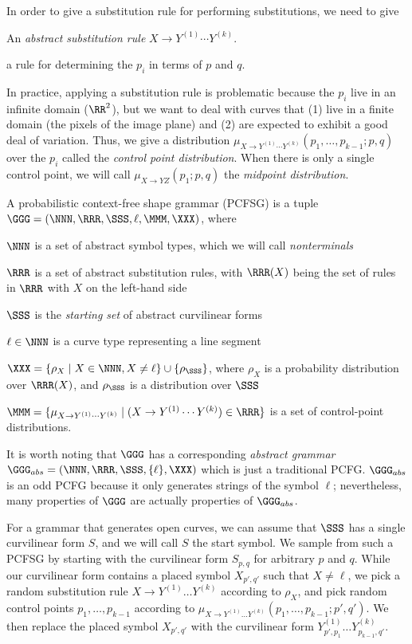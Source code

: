 In order to give a substitution rule for performing substitutions, we
need to give
\bitem
\item An {\em abstract substitution rule} $X\to Y^{(1)}\cdots Y^{(k)}$.
\item a rule for determining the $p_i$ in terms of $p$ and $q$.
\eitem

In practice, applying a substitution rule is problematic because the
$p_i$ live in an infinite domain ($\RR^2$), but we want to deal with
curves that (1) live in a finite domain (the pixels of the image
plane) and (2) are expected to exhibit a good deal of variation. Thus,
we give a distribution $\mu_{X\to Y^{(1)}\cdots Y^{(k)}}(p_1,\dots,
p_{k-1} ; p,q)$ over the $p_i$ called the {\em control point distribution}. 
When there is only a single control point, we will call $\mu_{X\to
YZ}(p_1; p,q)$ the {\em midpoint distribution}.

\begin{defn}
A probabilistic context-free shape grammar (PCFSG) is a tuple 
$\GGG = (\NNN, \RRR, \SSS, \ell, \MMM, \XXX)$, where
\bitem
\item $\NNN$ is a set of abstract symbol types, which we will call
  {\em nonterminals}
\item $\RRR$ is a set of abstract substitution rules, with $\RRR(X)$
  being the set of rules in $\RRR$ with $X$ on the left-hand side
\item $\SSS$ is the {\em starting set} of abstract curvilinear forms
\item $\ell \in \NNN$ is a curve type representing a line segment
\item $\XXX = \{ \rho_X \mid X\in \NNN, X\ne \ell \} \cup
  \{\rho_\SSS\}$, where $\rho_X$ is a probability distribution over
  $\RRR(X)$, and $\rho_\SSS$ is a distribution over $\SSS$
\item $\MMM = \{ \mu_{X\to Y^{(1)}\cdots Y^{(k)}} \mid (X\to
  Y^{(1)}\cdots Y^{(k)}) \in \RRR\}$ is a set of control-point
  distributions.
\eitem
\end{defn}

It is worth noting that $\GGG$ has a corresponding {\em abstract
  grammar} $\GGG_{abs} = (\NNN, \RRR, \SSS, \{\ell\}, \XXX)$ which is
just a traditional PCFG. $\GGG_{abs}$ is an odd PCFG because it only
generates strings of the symbol $\ell$; nevertheless, many properties
of $\GGG$ are actually properties of $\GGG_{abs}$.

For a grammar that generates open curves, we can assume that $\SSS$
has a single curvilinear form $S$, and we will call $S$ the start
symbol. We sample from such a PCFSG by starting with the curvilinear
form $S_{p,q}$ for arbitrary $p$ and $q$. While our curvilinear form
contains a placed symbol $X_{p',q'}$ such that $X\ne \ell$, we pick a
random substitution rule $X \to Y^{(1)} \dots Y^{(k)}$ according to
$\rho_X$, and pick random control points $p_1,\dots, p_{k-1}$
according to $\mu_{X\to Y^{(1)}\dots Y^{(k)}}(p_1, \dots, p_{k-1}; p',
q')$. We then replace the placed symbol $X_{p',q'}$ with the
curvilinear form $Y_{p',p_1}^{(1)} \dots Y_{p_{k-1},q'}^{(k)}$.

